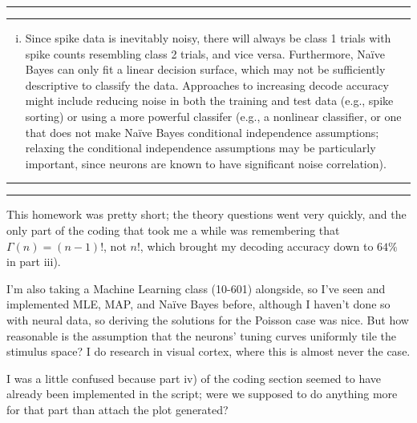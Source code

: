 \documentclass[11pt]{article}
\newcounter{questionCounter}
\newcounter{partCounter}[questionCounter]
\newenvironment{question}[2][\arabic{questionCounter}]{%
    \setcounter{partCounter}{0}%
    \vspace{.25in} \hrule \vspace{0.5em}%
        \noindent{\bf #2}%
    \vspace{0.8em} \hrule \vspace{.10in}%
    \addtocounter{questionCounter}{1}%
}{}
\begin{document}
\begin{question}{Problem 3}
\begin{enumerate}[A)]
\begin{enumerate}[i)]
\item Since spike data is inevitably noisy, there will always be class 1
trials with spike counts resembling class 2 trials, and vice versa.
Furthermore, Na\"ive Bayes can only fit a linear decision surface, which
may not be sufficiently descriptive to classify the data. Approaches to
increasing decode accuracy might include reducing noise in both the training
and test data (e.g., spike sorting) or using a more powerful classifer (e.g.,
a nonlinear classifier, or one that does not make Na\"ive Bayes conditional
independence assumptions; relaxing the conditional independence assumptions
may be particularly important, since neurons are known to have significant
noise correlation).
\end{enumerate}
\end{enumerate}
\end{question}

\begin{question}{Problem 4}
This homework was pretty short; the theory questions went very quickly, and
the only part of the coding that took me a while was remembering that
$\Gamma(n) = (n - 1)!$, not $n!$, which brought my decoding accuracy down to
$64\%$ in part iii).

I'm also taking a Machine Learning class (10-601) alongside, so I've seen and
implemented MLE, MAP, and Na\"ive Bayes before, although I haven't done so
with neural data, so deriving the solutions for the Poisson case was nice.
But how reasonable is the assumption that the neurons' tuning curves uniformly
tile the stimulus space? I do research in visual cortex, where this is almost
never the case.

I was a little confused because part iv) of the coding section seemed to have
already been implemented in the script; were we supposed to do anything more
for that part than attach the plot generated?
\end{question}
\end{document}
